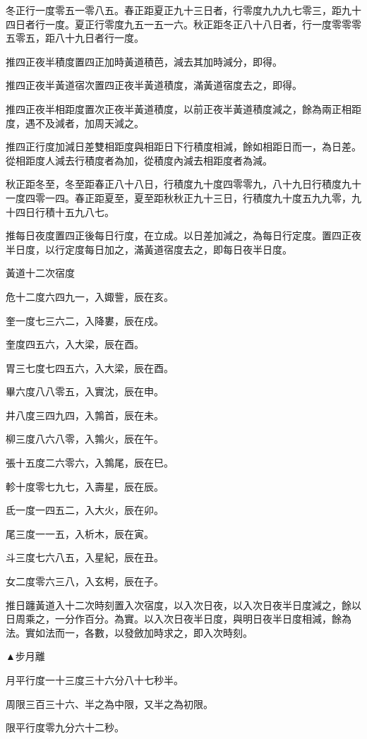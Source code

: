 冬正行一度零五一零八五。春正距夏正九十三日者，行零度九九九七零三，距九十四日者行一度。夏正行零度九五一五一六。秋正距冬正八十八日者，行一度零零零五零五，距八十九日者行一度。

推四正夜半積度置四正加時黃道積芭，減去其加時減分，即得。

推四正夜半黃道宿次置四正夜半黃道積度，滿黃道宿度去之，即得。

推四正夜半相距度置次正夜半黃道積度，以前正夜半黃道積度減之，餘為兩正相距度，遇不及減者，加周天減之。

推四正行度加減日差雙相距度與相距日下行積度相減，餘如相距日而一，為日差。從相距度人減去行積度者為加，從積度內減去相距度者為減。

秋正距冬至，冬至距春正八十八日，行積度九十度四零零九，八十九日行積度九十一度四零一四。春正距夏至，夏至距秋秋正九十三日，行積度九十度五九九零，九十四日行積十五九八七。

推每日夜度置四正後每日行度，在立成。以日差加減之，為每日行定度。置四正夜半日度，以行定度每日加之，滿黃道宿度去之，即每日夜半日度。

黃道十二次宿度

危十二度六四九一，入娵訾，辰在亥。

奎一度七三六二，入降婁，辰在戍。

奎度四五六，入大梁，辰在酉。

胃三七度七四五六，入大梁，辰在酉。

畢六度八八零五，入實沈，辰在申。

井八度三四九四，入鶉首，辰在未。

柳三度八六八零，入鶉火，辰在午。

張十五度二六零六，入鶉尾，辰在巳。

軫十度零七九七，入壽星，辰在辰。

氐一度一四五二，入大火，辰在卯。

尾三度一一五，入析木，辰在寅。

斗三度七六八五，入星紀，辰在丑。

女二度零六三八，入玄枵，辰在子。

推日躔黃道入十二次時刻置入次宿度，以入次日夜，以入次日夜半日度減之，餘以日周乘之，一分作百分。為實。以入次日夜半日度，與明日夜半日度相減，餘為法。實如法而一，各數，以發斂加時求之，即入次時刻。

▲步月離

月平行度一十三度三十六分八十七秒半。

周限三百三十六、半之為中限，又半之為初限。

限平行度零九分六十二秒。

